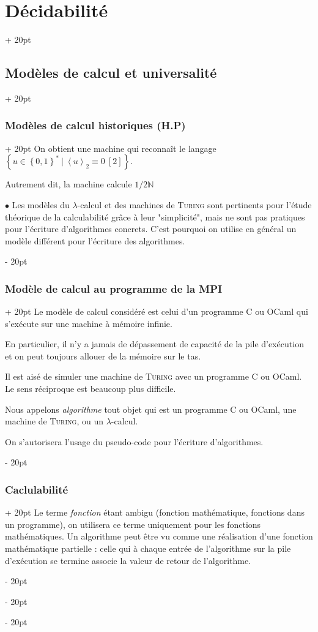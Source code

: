 \documentclass[a4paper, 12pt, twoside]{article}
\newcommand{\N}{\mathbb{N}} %
\newcommand{\set}[1]{\left\{ #1 \right\}}
\newcommand{\lrangle}[1]{\left\langle #1 \right\rangle}
\newcommand{\ind}[1][20pt]{\advance\leftskip + #1}
\newcommand{\deind}[1][20pt]{\advance\leftskip - #1}
\newenvironment{indt}[2][20pt]{#2 \par \ind[#1]}{\par \deind} %
\begin{document}
\begin{indt}{\section{Décidabilité}}
\begin{indt}{\subsection{Modèles de calcul et universalité}}
\begin{indt}{\subsubsection{Modèles de calcul historiques (H.P)}}
                 On obtient une machine qui reconnaît le langage $\set{u \in \set{0, 1}^*\ |\ \lrangle u _2 \equiv 0\ [2]}$.

                 Autrement dit, la machine calcule $1/2\N$

                 \vspace{12pt}
                 
                 $\bullet$ Les modèles du $\lambda$-calcul et des machines de \textsc{Turing} sont pertinents pour l'étude théorique de la calculabilité grâce à leur "simplicité", mais ne sont pas pratiques pour l'écriture d'algorithmes concrets. C'est pourquoi on utilise en général un modèle différent pour l'écriture des algorithmes.
            \end{indt}

            \vspace{12pt}
            
            \begin{indt}{\subsubsection{Modèle de calcul au programme de la MPI}}
                Le modèle de calcul considéré est celui d'un programme C ou OCaml qui s'exécute sur une machine à mémoire infinie.

                En particulier, il n'y a jamais de dépassement de capacité de la pile d'exécution et on peut toujours allouer de la mémoire sur le tas.

                Il est aisé de simuler une machine de \textsc{Turing} avec un programme C ou OCaml.
                Le sens réciproque est beaucoup plus difficile.

                Nous appelons \emph{algorithme} tout objet qui est un programme C ou OCaml, une machine de \textsc{Turing}, ou un $\lambda$-calcul.

                On s'autorisera l'usage du pseudo-code pour l'écriture d'algorithmes.
            \end{indt}

            \vspace{12pt}
            
            \begin{indt}{\subsubsection{Caclulabilité}}
                Le terme \emph{fonction} étant ambigu (fonction mathématique, fonctions dans un programme), on utilisera ce terme uniquement pour les fonctions mathématiques. Un algorithme peut être vu comme une réalisation d'une fonction mathématique partielle : celle qui à chaque entrée de l'algorithme sur la pile d'exécution se termine associe la valeur de retour de l'algorithme.


\end{indt}
\end{indt}
\end{indt}
\end{document}
